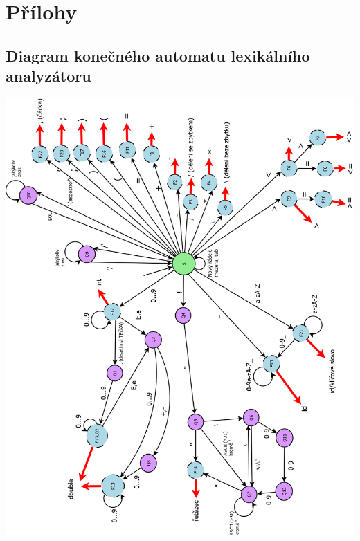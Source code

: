 \documentclass[11pt]{article}
\begin{document}
	\vfill
	\section{Přílohy}
	\subsection{Diagram konečného automatu lexikálního analyzátoru}
	\begin{center}
		\includegraphics[scale = 0.5]{automat.png}\\
	\end{center}
	\vfill
	
\end{document}
